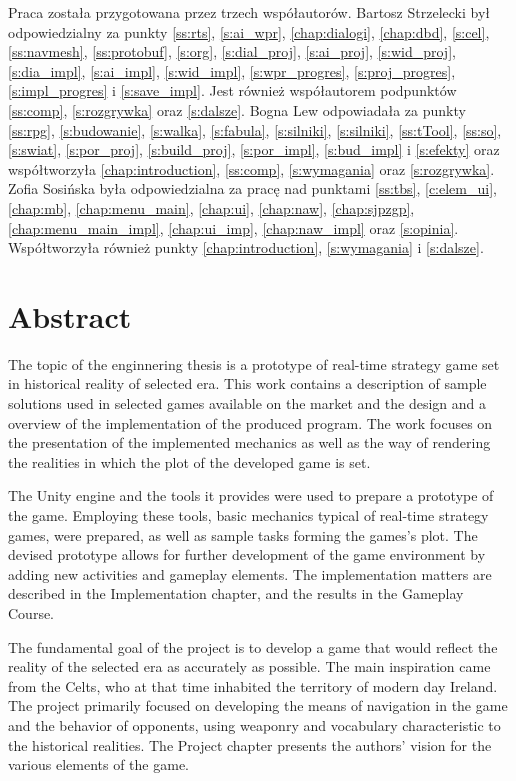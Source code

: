 Praca została przygotowana przez trzech współautorów. Bartosz Strzelecki był odpowiedzialny za punkty \ref{ss:rts},
\ref{s:ai_wpr}, \ref{chap:dialogi}, \ref{chap:dbd}, \ref{s:cel}, \ref{ss:navmesh}, \ref{ss:protobuf}, \ref{s:org},
\ref{s:dial_proj}, \ref{s:ai_proj}, \ref{s:wid_proj}, \ref{s:dia_impl}, \ref{s:ai_impl}, \ref{s:wid_impl}, \ref{s:wpr_progres}, \ref{s:proj_progres}, \ref{s:impl_progres} i
\ref{s:save_impl}. Jest również współautorem podpunktów \ref{ss:comp}, \ref{s:rozgrywka} oraz \ref{s:dalsze}. Bogna Lew
odpowiadała za punkty \ref{ss:rpg}, \ref{s:budowanie}, \ref{s:walka}, \ref{s:fabula}, \ref{s:silniki}, \ref{s:silniki},
\ref{ss:tTool}, \ref{ss:so}, \ref{s:swiat}, \ref{s:por_proj}, \ref{s:build_proj}, \ref{s:por_impl}, \ref{s:bud_impl} i
\ref{s:efekty} oraz współtworzyła \ref{chap:introduction}, \ref{ss:comp}, \ref{s:wymagania} oraz \ref{s:rozgrywka}.
Zofia Sosińska była odpowiedzialna za pracę nad punktami \ref{ss:tbs}, \ref{c:elem_ui}, \ref{chap:mb},
\ref{chap:menu_main}, \ref{chap:ui}, \ref{chap:naw}, \ref{chap:sjpzgp}, \ref{chap:menu_main_impl}, \ref{chap:ui_imp},
\ref{chap:naw_impl} oraz \ref{s:opinia}. Współtworzyła również punkty \ref{chap:introduction}, \ref{s:wymagania} i \ref{s:dalsze}.

\chapter*{Abstract}
The topic of the enginnering thesis is a prototype of real-time strategy game set in historical reality of selected era.
This work contains a description of sample solutions used in selected games available on the market
and the design and a overview of the implementation of the produced program. The work focuses on the presentation 
of the implemented mechanics as well as
the way of rendering the realities in which the plot of the developed game is set.

The Unity engine and the tools it provides were used to prepare a prototype of the game.
Employing these tools, basic mechanics typical of real-time strategy games, were prepared,
as well as sample tasks forming the games's plot. The devised prototype allows for 
further development of the game environment by adding new activities and gameplay elements.
The implementation matters are described in the Implementation chapter, and the results in the Gameplay Course.

The fundamental goal of the project is to develop a game that would reflect the reality of the selected era as accurately as possible.
The main inspiration came from the Celts, who at that time inhabited the territory of modern day Ireland. 
The project primarily focused on
developing the means of navigation in the game and the behavior of opponents, using weaponry and vocabulary characteristic to the
historical realities. The Project chapter presents the authors' vision for the various elements of the game.

